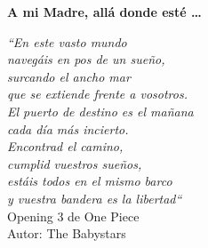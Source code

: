 % 
% 
% 
% 
% 
% 
% 
% 

% 
% 

\thispagestyle{empty}

\begin{flushright}

  \vspace*{\fill}

  \textbf{A mi Madre, allá donde esté \ldots}\\

  \vspace{3cm}

  \emph{``En este vasto mundo \\
  	navegáis en pos de un sueño,  \\
  	surcando el ancho mar  \\
  	que se extiende frente a vosotros.  \\
  	El puerto de destino es el mañana  \\
  	cada día más incierto.  \\
  	Encontrad el camino,  \\
  	cumplid vuestros sueños,  \\
  	estáis todos en el mismo barco  \\
  	y vuestra bandera es la libertad``}\\ 
    Opening 3 de One Piece \\
    Autor: The Babystars

\end{flushright}  

\vspace{4cm}
\vspace*{\fill}




